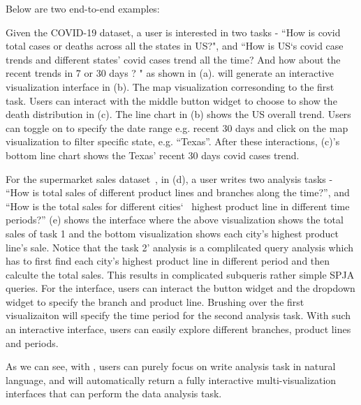 Below are two end-to-end examples: 
\begin{example}
Given the COVID-19 dataset, a user is interested in two tasks - ``How is covid total cases or deaths across all the states in US?", and ``How is US‘s covid case trends and different states’ covid cases trend all the time?  And how about the recent trends in 7 or 30 days ? " as shown in (a). \sys will generate an interactive visualization interface in (b). The map visualization corresonding to the first task. Users can interact with the middle button widget to choose to show the death distribution in (c). The line chart in (b) shows the US overall trend. Users can toggle on to specify the date range e.g. recent 30 days and click on the map visualization to filter specific state, e.g. ``Texas''. After these interactions, (c)'s bottom line chart shows the Texas' recent 30 days covid cases trend. 
        
\end{example}

\begin{example}
For the supermarket sales dataset~\cite{kagglesales}, in (d), a user writes two analysis tasks - ``How is total sales of different product lines and branches along the time?'', and ``How is the total sales for different cities‘  highest product line in different time periods?'' (e) shows the interface where the above visualization shows the total sales of task 1 and the bottom visualization shows each city's highest product line's sale. Notice that the task 2' analysis is a complilcated query analysis which has to first find each city's highest product line in different period and then calculte the total sales. This results in complicated subqueris rather simple SPJA queries. For the interface, users can interact the button widget and the dropdown widget to specify the branch and product line. Brushing over the first visualizaiton will specify the time period for the second analysis task. 
 With such an interactive interface, users can easily explore different branches, product lines and periods. 
        
\end{example}

As we can see,  with \sys, users can purely focus on write analysis task in natural language, and \sys will automatically return a fully interactive multi-visualization interfaces that can perform the data analysis task. 


